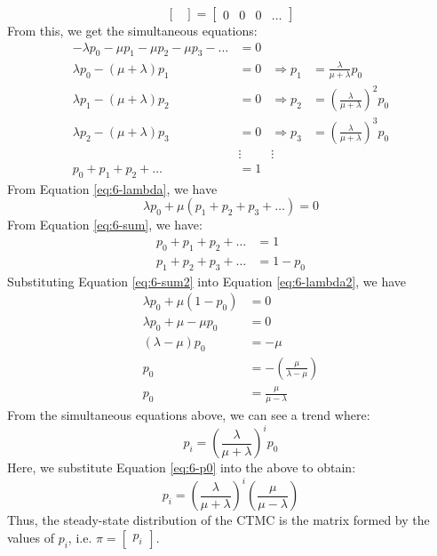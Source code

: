 \documentclass[12pt]{article}
\begin{document}
\begin{equation*}
\begin{bmatrix}
    \end{bmatrix} = \begin{bmatrix}
        0 & 0 & 0 & \dots
    \end{bmatrix}
\end{equation*} From this, we get the simultaneous equations: \begin{align}\label{eq:6-lambda}
    -\lambda p_{0} - \mu p_{1} - \mu p_{2} - \mu p_{3} - \dots &= 0 & \\ \nonumber
    \lambda p_{0} - (\mu + \lambda)p_{1} &= 0 & \Longrightarrow p_{1} &= \frac{\lambda}{\mu+\lambda}p_{0} \\ \nonumber
    \lambda p_{1} - (\mu + \lambda)p_{2} &= 0 & \Longrightarrow p_{2} &= \left( \frac{\lambda}{\mu+\lambda} \right)^2p_{0}\\ \nonumber
    \lambda p_{2} - (\mu + \lambda)p_{3} &= 0 & \Longrightarrow p_{3} &= \left( \frac{\lambda}{\mu+\lambda}\right)^{3} p_{0}\\ \nonumber
    &\vdots &\vdots \\ \label{eq:6-sum}
    p_{0} + p_{1} + p_{2} + \dots &= 1
\end{align} From Equation \ref{eq:6-lambda}, we have \begin{equation}\label{eq:6-lambda2}
    \lambda p_{0} + \mu\left( p_{1} + p_{2} + p_{3} + \dots \right) = 0
\end{equation} From Equation \ref{eq:6-sum}, we have: \begin{align}\nonumber
    p_{0} + p_{1} + p_{2} + \dots &= 1 \\ \label{eq:6-sum2}
    p_{1} + p_{2} + p_{3} + \dots &= 1 - p_{0}
\end{align} Substituting Equation \ref{eq:6-sum2} into Equation \ref{eq:6-lambda2}, we have \begin{align}\nonumber
    \lambda p_{0} + \mu(1-p_{0}) &= 0 \\ \nonumber
    \lambda p_{0} + \mu - \mu p_{0} &= 0 \\ \nonumber
    (\lambda - \mu)p_{0} &= -\mu \\ \nonumber
    p_{0} &= - \left( \frac{\mu}{\lambda-\mu} \right) \\ \label{eq:6-p0}
    p_{0} &= \boxed{\frac{\mu}{\mu-\lambda}}
\end{align} From the simultaneous equations above, we can see a trend where: \begin{equation}
    p_i = \left( \frac{\lambda}{\mu + \lambda} \right)^{i} p_{0}
\end{equation} Here, we substitute Equation \ref{eq:6-p0} into the above to obtain: \begin{equation}
    p_i = \left( \frac{\lambda}{\mu+\lambda} \right)^{i}\left( \frac{\mu}{\mu-\lambda} \right)
\end{equation} Thus, the steady-state distribution of the CTMC is the matrix formed by the values of $p_i$, i.e. $\pi = \begin{bmatrix}
    p_i
\end{bmatrix}$.
\end{document}
